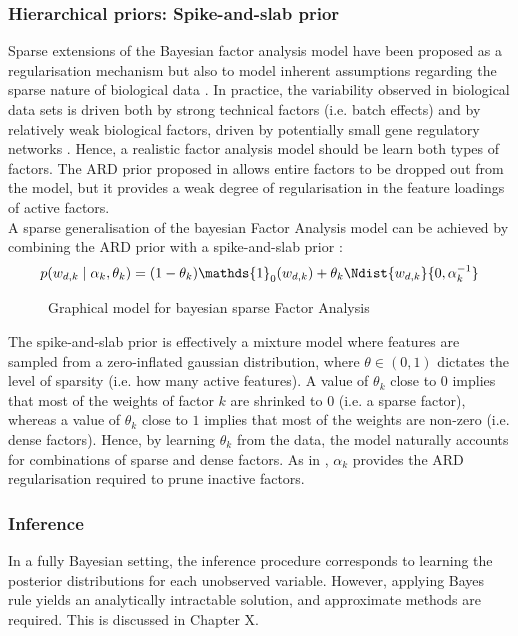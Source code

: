 \subsubsection{Hierarchical priors: Spike-and-slab prior}
Sparse extensions of the Bayesian factor analysis model have been proposed as a regularisation mechanism but also to model inherent assumptions regarding the sparse nature of biological data \cite{West2003,Stegle2012,Gao2013}. In practice, the variability observed in biological data sets is driven both by strong technical factors (i.e. batch effects) and by relatively weak biological factors, driven by potentially small gene regulatory networks \cite{Gao2013}. Hence, a realistic factor analysis model should be learn both types of factors. The ARD prior proposed in  allows entire factors to be dropped out from the model, but it provides a weak degree of regularisation in the feature loadings of active factors.\\
A sparse generalisation of the bayesian Factor Analysis model can be achieved by combining the ARD prior with a spike-and-slab prior \cite{(Mitchell and Beauchamp, 1988) }:
\begin{equation}
	p(w_{d,k} \mid \alpha_k,\theta_k) = (1-\theta_k) \mathds{1}_0(w_{d,k}) + \theta_k \Ndist{w_{d,k}}{0, \alpha_k^{-1}}
\end{equation}

\begin{figure}[H] \begin{center}
	
	\label{fig:bayesianFA}
	\caption{Graphical model for bayesian sparse Factor Analysis}
\end{center} \end{figure}

The spike-and-slab prior is effectively a mixture model where features are sampled from a zero-inflated gaussian distribution, where $\theta \in (0,1)$ dictates the level of sparsity (i.e. how many active features). A value of $\theta_k$ close to $0$ implies that most of the weights of factor $k$ are shrinked to $0$ (i.e. a sparse factor), whereas a value of $\theta_k$ close to $1$ implies that most of the weights are non-zero (i.e. dense factors). Hence, by learning $\theta_k$ from the data, the model naturally accounts for combinations of sparse and dense factors. As in , $\alpha_k$ provides the ARD regularisation required to prune inactive factors. \\


\subsubsection{Inference}
In a fully Bayesian setting, the inference procedure corresponds to learning the posterior distributions for each unobserved variable. However, applying Bayes rule yields an analytically intractable solution, and approximate methods are required. This is discussed in Chapter X.

